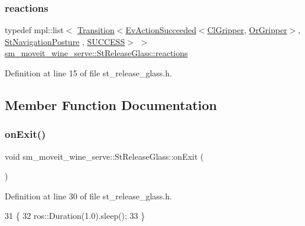 \subsubsection{\texorpdfstring{reactions}{reactions}}
{\footnotesize\ttfamily typedef mpl\+::list$<$ \hyperlink{classsmacc_1_1Transition}{Transition}$<$\hyperlink{structsmacc_1_1default__events_1_1EvActionSucceeded}{Ev\+Action\+Succeeded}$<$\hyperlink{classsm__moveit__wine__serve_1_1cl__gripper_1_1ClGripper}{Cl\+Gripper}, \hyperlink{classsm__moveit__wine__serve_1_1OrGripper}{Or\+Gripper}$>$, \hyperlink{structsm__moveit__wine__serve_1_1StNavigationPosture}{St\+Navigation\+Posture} , \hyperlink{structsmacc_1_1default__transition__tags_1_1SUCCESS}{S\+U\+C\+C\+E\+SS}$>$ $>$ \hyperlink{structsm__moveit__wine__serve_1_1StReleaseGlass_af1674c12703267ddfd7d0ff5fa6394f6}{sm\+\_\+moveit\+\_\+wine\+\_\+serve\+::\+St\+Release\+Glass\+::reactions}}



Definition at line 15 of file st\+\_\+release\+\_\+glass.\+h.



\subsection{Member Function Documentation}
\mbox{\label{structsm__moveit__wine__serve_1_1StReleaseGlass_aada61c1daeedac941ae6ac865e87b971}} 
\subsubsection{\texorpdfstring{on\+Exit()}{onExit()}}
{\footnotesize\ttfamily void sm\+\_\+moveit\+\_\+wine\+\_\+serve\+::\+St\+Release\+Glass\+::on\+Exit (\begin{DoxyParamCaption}{ }\end{DoxyParamCaption})\hspace{0.3cm}{\ttfamily [inline]}}



Definition at line 30 of file st\+\_\+release\+\_\+glass.\+h.


\begin{DoxyCode}
31         \{
32             ros::Duration(1.0).sleep();
33         \}
\end{DoxyCode}
\mbox{\label{structsm__moveit__wine__serve_1_1StReleaseGlass_a79b2f652fe4d43d24c1704480d3257a3}} 

